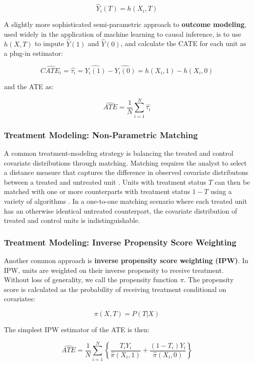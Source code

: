 $$\hat{Y}_i(T)=h(X_i,T)$$

A slightly more sophisticated semi-parametric approach to \textbf{outcome modeling}, used widely in the application of machine learning to causal inference, is to use $h(X,T)$ to impute $\hat{Y}(1)$ and $\hat{Y}(0)$, and calculate the CATE for each unit as a plug-in estimator:

$$\widehat{CATE_i}=\hat{\tau_i}=\hat{Y_i(1)}-\hat{Y_i(0)}=h(X_i,1)-h(X_i,0)$$

and the ATE as:

$$\widehat{ATE}=\frac{1}{N}\sum_{i=1}^N{\hat{\tau_i}}$$

\subsubsection{Treatment Modeling: Non-Parametric Matching}
\label{subsection:doublyrobust}

A common treatment-modeling strategy is balancing the treated and control covariate distributions through matching. Matching requires the analyst to select a distance measure that captures the difference in observed covariate distributons between a treated and untreated unit \citep{austin2011introduction}. Units with treatment status $T$ can then be matched with one or more counterparts with treatment status $1-T$ using a variety of algorithms \citep{stuart2010matching}. In a one-to-one matching scenario where each treated unit has an otherwise identical untreated counterpart, the covariate distribution of treated and control units is indistinguishable. 

\subsubsection{Treatment Modeling: Inverse Propensity Score Weighting}
\label{subsection:treatmentmodeling}

Another common approach is \textbf{inverse propensity score weighting (IPW)}. In IPW, units are weighted on their inverse propensity to receive treatment. Without loss of generality, we call the propensity function $\pi$. The propensity score is calculated as the probability of receiving treatment conditional on covariates:

$$\pi(X,T)=P(T|X)$$

The simplest IPW estimator of the ATE is then:

 \begin{equation}\label{propscore}
    \widehat{ATE}=\frac{1}{N}\sum_{i=1}^N\left\{\frac{T_iY_i}{\hat{\pi}(X_i,1)}+\frac{(1-T_i)Y_i}{\hat{\pi}(X_i,0)}\right\}
\end{equation}

